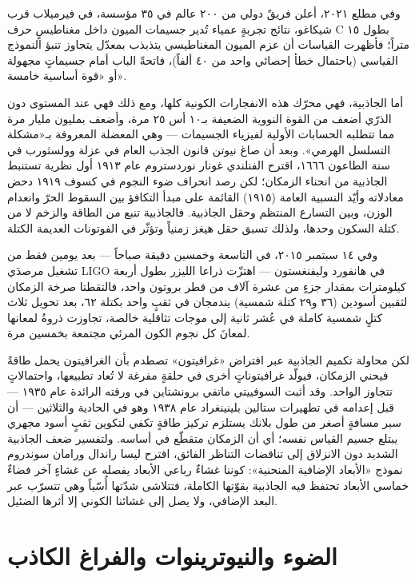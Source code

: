\documentclass[12pt,a4paper,openany]{book}
\begin{document}
وفي مطلع ٢٠٢١، أعلن فريقٌ دولي من ٢٠٠ عالم في ٣٥ مؤسسة، في فيرميلاب قرب شيكاغو، نتائج تجربةٍ عمياء تُدير جسيمات الميون داخل مغناطيسٍ حرف C بطول ١٥ متراً؛ فأظهرت القياسات أن عزم الميون المغناطيسي يتذبذب بمعدّل يتجاوز تنبؤ النموذج القياسي (باحتمال خطأ إحصائي واحد من ٤٠ ألفاً)، فاتحةً الباب أمام جسيماتٍ مجهولة أو «قوة أساسية خامسة».


أما الجاذبية، فهي محرّك هذه الانفجارات الكونية كلها، ومع ذلك فهي عند المستوى دون الذرّي أضعف من القوة النووية الضعيفة بـ١٠ أس ٢٥ مرة، وأضعف بمليون مليار مرة مما تتطلبه الحسابات الأولية لفيزياء الجسيمات — وهي المعضلة المعروفة بـ«مشكلة التسلسل الهرمي». وبعد أن صاغ نيوتن قانون الجذب العام في عزلة وولسثورب في سنة الطاعون ١٦٦٦، اقترح الفنلندي غونار نوردستروم عام ١٩١٣ أول نظرية تستنبط الجاذبية من انحناء الزمكان؛ لكن رصد انحراف ضوء النجوم في كسوف ١٩١٩ دحض معادلاته وأيّد النسبية العامة (١٩١٥) القائمة على مبدأ التكافؤ بين السقوط الحرّ وانعدام الوزن، وبين التسارع المنتظم وحقل الجاذبية. فالجاذبية تنبع من الطاقة والزخم لا من كتلة السكون وحدها، ولذلك تسبق حقل هيغز زمنياً وتؤثّر في الفوتونات العديمة الكتلة.


وفي ١٤ سبتمبر ٢٠١٥، في التاسعة وخمسين دقيقة صباحاً — بعد يومين فقط من تشغيل مرصدَي LIGO في هانفورد وليفنغستون — اهتزّت ذراعا الليزر بطول أربعة كيلومترات بمقدار جزءٍ من عشرة آلاف من قطر بروتون واحد، فالتقطتا صرخة الزمكان لثقبين أسودين (٣٦ و٢٩ كتلة شمسية) يندمجان في ثقبٍ واحد بكتلة ٦٢، بعد تحويل ثلاث كتلٍ شمسية كاملة في عُشر ثانية إلى موجات تثاقلية خالصة، تجاوزت ذروةُ لمعانها لمعانَ كل نجوم الكون المرئي مجتمعة بخمسين مرة.


لكن محاولة تكميم الجاذبية عبر افتراض «غرافيتون» تصطدم بأن الغرافيتون يحمل طاقةً فيحني الزمكان، فيولّد غرافيتوناتٍ أخرى في حلقةٍ مفرغة لا تُعاد تطبيعها، واحتمالاتٍ تتجاوز الواحد. وقد أثبت السوفييتي ماتفي برونشتاين في ورقته الرائدة عام ١٩٣٥ — قبل إعدامه في تطهيرات ستالين بلينينغراد عام ١٩٣٨ وهو في الحادية والثلاثين — أن سبر مسافةٍ أصغر من طول بلانك يستلزم تركيز طاقةٍ تكفي لتكوين ثقبٍ أسود مجهري يبتلع جسيم القياس نفسه؛ أي أن الزمكان متقطّع في أساسه. ولتفسير ضعف الجاذبية الشديد دون الانزلاق إلى تناقضات التناظر الفائق، اقترح ليسا راندال ورامان سوندروم نموذج «الأبعاد الإضافية المنحنية»: كوننا غشاءٌ رباعي الأبعاد يفصله عن غشاءٍ آخر فضاءٌ خماسي الأبعاد تحتفظ فيه الجاذبية بقوّتها الكاملة، فتتلاشى شدّتها أُسّياً وهي تتسرّب عبر البعد الإضافي، ولا يصل إلى غشائنا الكوني إلا أثرها الضئيل.


\chapter*{الضوء والنيوترينوات والفراغ الكاذب}
\end{document}
